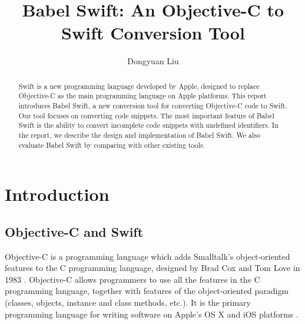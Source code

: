 \documentclass{sfuthesis}
\title{Babel Swift: An Objective-C to Swift Conversion Tool}
\author{Dongyuan Liu}
\begin{document}
\frontmatter
\maketitle{}

\begin{abstract}
Swift is a new programming language developed by Apple, designed to replace Objective-C as the main programming language on Apple platforms. This report introduces Babel Swift, a new conversion tool for converting Objective-C code to Swift. Our tool focuses on converting code snippets. The most important feature of Babel Swift is the ability to convert incomplete code snippets with undefined identifiers. In the report, we describe the design and implementation of Babel Swift. We also evaluate Babel Swift by comparing with other existing tools.
\end{abstract}





\tableofcontents\clearpage
{}\listoftables\clearpage
{}\listoflistings





%
%

\mainmatter%

\chapter{Introduction}

\section{Objective-C and Swift}

Objective-C is a programming language which adds Smalltalk's object-oriented features to the C programming language, designed by Brad Cox and Tom Love in 1983 \cite{cox1983object}. Objective-C allows programmers to use all the features in the C programming language, together with features of the object-oriented paradigm (classes, objects, instance and class methods, etc.). It is the primary programming language for writing software on Apple's OS X and iOS platforms \cite{aboutobjc}.
\end{document}
